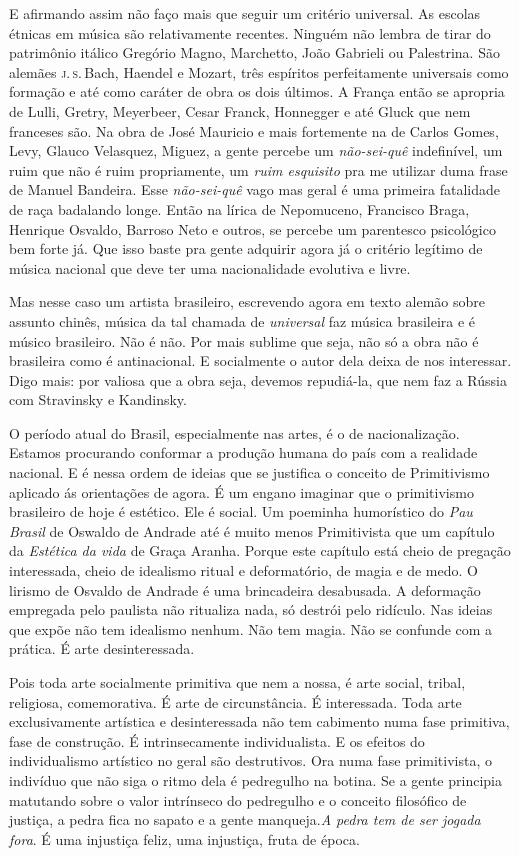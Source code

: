 E afirmando assim não faço mais que seguir um critério universal. As
escolas étnicas em música são relativamente recentes. Ninguém não lembra
de tirar do patrimônio itálico Gregório Magno, Marchetto, João Gabrieli
ou Palestrina. São alemães \textsc{j.\,s.}\,Bach, Haendel e Mozart, três espíritos
perfeitamente universais como formação e até como caráter de obra os
dois últimos. A França então se apropria de Lulli, Gretry, Meyerbeer,
Cesar Franck, Honnegger e até Gluck que nem franceses são. Na obra de
José Mauricio e mais fortemente na de Carlos Gomes, Levy, Glauco
Velasquez, Miguez, a gente percebe um \textit{não-sei-quê} indefinível, um ruim
que não é ruim propriamente, um \textit{ruim esquisito} pra me utilizar
duma frase de Manuel Bandeira. Esse \textit{não-sei-quê} vago mas geral é uma
primeira fatalidade de raça badalando longe. Então na lírica de
Nepomuceno, Francisco Braga, Henrique Osvaldo, Barroso Neto e outros, se
percebe um parentesco psicológico bem forte já. Que isso baste pra gente
adquirir agora já o critério legítimo de música nacional que deve ter
uma nacionalidade evolutiva e livre.

Mas nesse caso um artista brasileiro, escrevendo agora em texto alemão
sobre assunto chinês, música da tal chamada de \textit{universal} faz
música brasileira e é músico brasileiro. Não é não. Por mais sublime que
seja, não só a obra não é brasileira como é antinacional. E socialmente
o autor dela deixa de nos interessar. Digo mais: por valiosa que a obra
seja, devemos repudiá-la, que nem faz a Rússia com Stravinsky e
Kandinsky.

O período atual do Brasil, especialmente nas artes, é o de
nacionalização. Estamos procurando conformar a produção humana do país
com a realidade nacional. E é nessa ordem de ideias que se justifica o
conceito de Primitivismo aplicado ás orientações de agora. É um engano
imaginar que o primitivismo brasileiro de hoje é estético. Ele é social.
Um poeminha humorístico do \textit{Pau Brasil} de Oswaldo de Andrade até é
muito menos Primitivista que um capítulo da \textit{Estética da vida} de
Graça Aranha. Porque este capítulo está cheio de pregação interessada,
cheio de idealismo ritual e deformatório, de magia e de medo. O lirismo
de Osvaldo de Andrade é uma brincadeira desabusada. A deformação
empregada pelo paulista não ritualiza nada, só destrói pelo ridículo.
Nas ideias que expõe não tem idealismo nenhum. Não tem magia. Não se
confunde com a prática. É arte desinteressada.

Pois toda arte socialmente primitiva que nem a nossa, é arte social,
tribal, religiosa, comemorativa. É arte de circunstância. É interessada.
Toda arte exclusivamente artística e desinteressada não tem cabimento
numa fase primitiva, fase de construção. É intrinsecamente
individualista. E os efeitos do individualismo artístico no geral são
destrutivos. Ora numa fase primitivista, o indivíduo que não siga o
ritmo dela é pedregulho na botina. Se a gente principia matutando sobre
o valor intrínseco do pedregulho e o conceito filosófico de justiça, a
pedra fica no sapato e a gente manqueja.\textit{A pedra tem de ser jogada
fora}. É uma injustiça feliz, uma injustiça, fruta de época.

